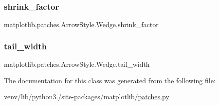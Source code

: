 \subsubsection{\texorpdfstring{shrink\+\_\+factor}{shrink\_factor}}
{\footnotesize\ttfamily matplotlib.\+patches.\+Arrow\+Style.\+Wedge.\+shrink\+\_\+factor}

\mbox{\label{classmatplotlib_1_1patches_1_1ArrowStyle_1_1Wedge_a92d725ddac6c38342dceefb3e2e21feb}} 
\subsubsection{\texorpdfstring{tail\+\_\+width}{tail\_width}}
{\footnotesize\ttfamily matplotlib.\+patches.\+Arrow\+Style.\+Wedge.\+tail\+\_\+width}



The documentation for this class was generated from the following file\+:\begin{DoxyCompactItemize}
\item 
venv/lib/python3./site-\/packages/matplotlib/\hyperlink{patches_8py}{patches.\+py}\end{DoxyCompactItemize}
